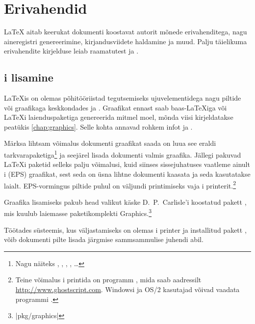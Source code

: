 
\chapter{Erivahendid}
\begin{intro}
  \LaTeX{} aitab keerukat dokumenti koostavat autorit mõnede
  erivahenditega, nagu aineregistri genereerimine, kirjandusviidete
  haldamine ja muud. Palju täielikuma erivahendite kirjelduse leiab
  raamatutest \manual{} ja \companion.
\end{intro}

\section{\EPSi i lisamine}\label{eps}

\LaTeX is on olemas põhitööriistad tegutsemiseks ujuvelementidega nagu
piltide või graafikaga keskkondades  ja .
Graafikat ennast saab baas-\LaTeX iga või \LaTeX i
laienduspaketiga genereerida mitmel moel, mõnda viisi kirjeldatakse
peatükis \ref{chap:graphics}. Selle kohta annavad rohkem infot
\companion{} ja \manual{}.

Märksa lihtsam võimalus dokumenti graafikat saada on luua see eraldi
tarkvarapaketiga\footnote{Nagu näiteks , ,
, ,
\ldots} ja seejärel lisada dokumenti valmis graafika.
Jällegi pakuvad \LaTeX i paketid selleks palju võimalusi, kuid siinses
sissejuhatuses vaatleme ainult \ePSi i (EPS) graafikat, sest seda on
üsna lihtne dokumenti kaasata ja seda kasutatakse laialt. EPS-vormingus
piltide puhul on väljundi printimiseks vaja \PSi i
printerit.\footnote{Teine võimalus \PSi i printida on programm
, mida saab aadressilt \url{http://www.ghostscript.com}.
Windowsi ja OS/2 kasutajad võivad vaadata programmi .}

Graafika lisamiseks pakub head valikut käske D.~P.~Carlisle'i koostatud pakett , mis kuulub
laiemasse paketikomplekti Graphics.\footnote{\CTAN|pkg/graphics|}

Töötades süsteemis, kus väljastamiseks on olemas \PSi i printer ja
installitud pakett , võib dokumenti pilte lisada
järgmise sammsammulise juhendi abil.\pagebreak

